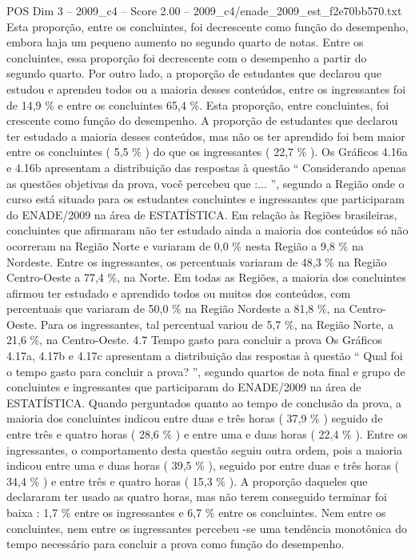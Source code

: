 \begin{textsample}{POS Dim 3 – 2009\_c4 – Score 2.00 – 2009\_c4/enade\_2009\_est\_f2e70bb570.txt}
Esta proporção, entre os concluintes, foi decrescente como função do desempenho, embora haja um pequeno aumento no segundo quarto de notas.
Entre os concluintes, essa proporção foi decrescente com o desempenho a partir do segundo quarto.
Por outro lado, a proporção de estudantes que declarou que estudou e aprendeu todos ou a maioria desses conteúdos, entre os ingressantes foi de 14,9 \% e entre os concluintes 65,4 \%.
Esta proporção, entre concluintes, foi crescente como função do desempenho.
A proporção de estudantes que declarou ter estudado a maioria desses conteúdos, mas não os ter aprendido foi bem maior entre os concluintes ( 5,5 \% ) do que os ingressantes ( 22,7 \% ).
Os Gráficos 4.16a e 4.16b apresentam a distribuição das respostas à questão “ Considerando apenas as questões objetivas da prova, você percebeu que :... ”, segundo a Região onde o curso está situado para os estudantes concluintes e ingressantes que participaram do ENADE/2009 na área de ESTATÍSTICA.
Em relação às Regiões brasileiras, concluintes que afirmaram não ter estudado ainda a maioria dos conteúdos só não ocorreram na Região Norte e variaram de 0,0 \% nesta Região a 9,8 \% na Nordeste.
Entre os ingressantes, os percentuais variaram de 48,3 \% na Região Centro-Oeste a 77,4 \%, na Norte.
Em todas as Regiões, a maioria dos concluintes afirmou ter estudado e aprendido todos ou muitos dos conteúdos, com percentuais que variaram de 50,0 \% na Região Nordeste a 81,8 \%, na Centro-Oeste.
Para os ingressantes, tal percentual variou de 5,7 \%, na Região Norte, a 21,6 \%, na Centro-Oeste. 4.7 Tempo gasto para concluir a prova Os Gráficos 4.17a, 4.17b e 4.17c apresentam a distribuição das respostas à questão “ Qual foi o tempo gasto para concluir a prova? ”, segundo quartos de nota final e grupo de concluintes e ingressantes que participaram do ENADE/2009 na área de ESTATÍSTICA.
Quando perguntados quanto ao tempo de conclusão da prova, a maioria dos concluintes indicou entre duas e três horas ( 37,9 \% ) seguido de entre três e quatro horas ( 28,6 \% ) e entre uma e duas horas ( 22,4 \% ).
Entre os ingressantes, o comportamento desta questão seguiu outra ordem, pois a maioria indicou entre uma e duas horas ( 39,5 \% ), seguido por entre duas e três horas ( 34,4 \% ) e entre três e quatro horas ( 15,3 \% ).
A proporção daqueles que declararam ter usado as quatro horas, mas não terem conseguido terminar foi baixa : 1,7 \% entre os ingressantes e 6,7 \% entre os concluintes.
Nem entre os concluintes, nem entre os ingressantes percebeu -se uma tendência monotônica do tempo necessário para concluir a prova como função do desempenho.

\end{textsample}
